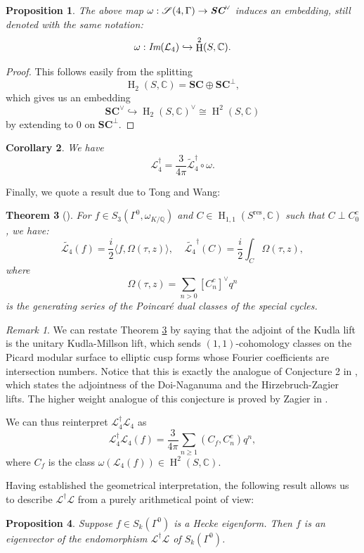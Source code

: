 \documentclass[12pt,a4paper,reqno]{amsart}
\theoremstyle{definition}
\numberwithin{definition}{subsection}
\theoremstyle{definition}
\numberwithin{Definition}{subsection}
\theoremstyle{remark}
\theoremstyle{remark}
\newtheorem{Remark}{Remark}
\numberwithin{Remark}{subsection}
\theoremstyle{remark}
\theoremstyle{plain}
\newtheorem{Theorem}{Theorem}
\numberwithin{Theorem}{subsection}
\theoremstyle{plain}
\theoremstyle{plain}
\theoremstyle{plain}
\newtheorem{Corollary}[Theorem]{Corollary}
\theoremstyle{plain}
\theoremstyle{plain}
\theoremstyle{plain}
\newtheorem{Proposition}[Theorem]{Proposition}
\theoremstyle{plain}
\newcommand*{\Q}{\mathbb{Q}}
\newcommand*{\Cc}{\mathbb{C}}
\DeclareMathOperator{\h}{H}
\begin{document}
\begin{Proposition}
The above map $\omega:\mathscr{S}(4,\Gamma)\to \emph{\textbf{SC}}^\vee$ induces an embedding, still denoted with the same notation:
\[
\omega:\emph{Im}(\mathcal{L}_4)\hookrightarrow \h^2(S, \Cc).
\]
 
\end{Proposition}

\begin{proof}
This follows easily from the splitting
\[
\h_2(S, \Cc)=\textbf{SC}\oplus \textbf{SC}^\perp,
\]
which gives us an embedding
\[
\textbf{SC}^\vee\hookrightarrow \h_2(S, \Cc)^\vee\cong \h^2(S, \Cc)
\]
by extending to $0$ on $\textbf{SC}^\perp$.
\end{proof}

\begin{Corollary}
We have
\[
\mathcal{L}_4^\dagger =\frac{3}{4\pi}\tilde{\mathcal{L}}_4^\dagger\circ\omega.
\]
\end{Corollary}

\noindent Finally, we quote a result due to Tong and Wang:
\begin{Theorem}[]
\label{3}
For $f\in S_3(\Gamma^0,\omega_{K/\Q})$ and $C\in \h_{1,1}(S^{\text{res}},\Cc)$ such that $C\perp C_0^c$, we have:
$$\tilde{\mathcal{L}_4}(f)=\frac{i}{2}\langle f, \Omega(\tau, z)\rangle,\;\;\;\;\tilde{\mathcal{L}_4}^\dagger(C)=\frac{i}{2}\int_{C} \Omega(\tau, z),$$
where $$\Omega(\tau,z)=\sum_{n>0} [C_n^c]^\vee q^n$$ is the generating series of the Poincaré dual classes of the special cycles.
\end{Theorem}
\begin{Remark}
We can restate Theorem \ref{3} by saying that the adjoint of the Kudla lift is the unitary Kudla-Millson lift, which sends $(1,1)$-cohomology classes on the Picard modular surface to elliptic cusp forms whose Fourier coefficients are intersection numbers. Notice that this is exactly the analogue of Conjecture 2 in \cite[p. 109]{hirzebruch}, which states the adjointness of the Doi-Naganuma and the Hirzebruch-Zagier lifts. The higher weight analogue of this conjecture is proved by Zagier in \cite[\S 6]{zagier}.
\end{Remark}
\noindent We can thus reinterpret $\mathcal{L}_4^\dagger\mathcal{L}_4$ as
\[
\mathcal{L}_4^\dagger \mathcal{L}_4(f)=\frac{3}{4\pi}\sum_{n\geq 1}(C_f,C_n^c)q^n,
\]
where $C_f$ is the class $\omega(\mathcal{L}_4(f))\in \h^2(S, \Cc)$. 

Having established the geometrical interpretation, the following result allows us to describe $\mathcal{L}^\dagger \mathcal{L}$ from a purely arithmetical point of view:
\begin{Proposition}
Suppose $f\in S_k(\Gamma^0)$ is a Hecke eigenform. Then $f$ is an eigenvector of the endomorphism $\mathcal{L}^\dagger \mathcal{L}$ of $S_k(\Gamma^0)$.
\end{Proposition}
\end{document}
